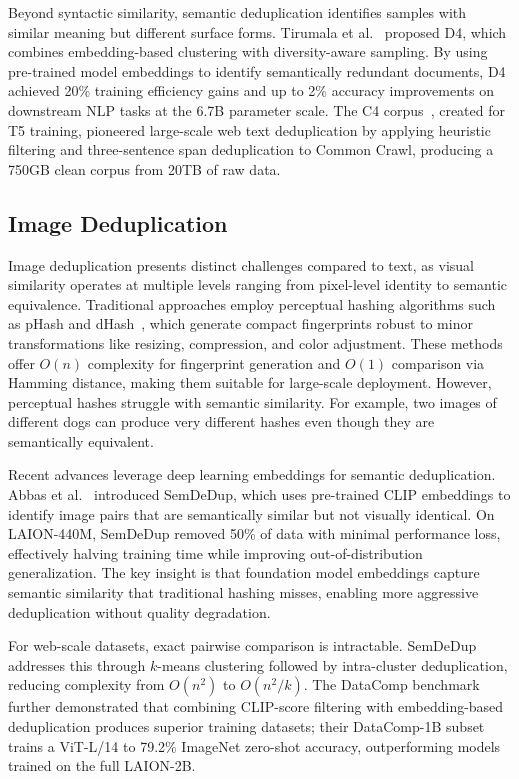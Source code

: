 \documentclass[sigconf, nonacm]{acmart}
\begin{document}
Beyond syntactic similarity, semantic deduplication identifies samples with similar meaning but different surface forms. Tirumala et al.~\cite{tirumala2023d4} proposed D4, which combines embedding-based clustering with diversity-aware sampling. By using pre-trained model embeddings to identify semantically redundant documents, D4 achieved 20\% training efficiency gains and up to 2\% accuracy improvements on downstream NLP tasks at the 6.7B parameter scale. The C4 corpus~\cite{raffel2020exploring}, created for T5 training, pioneered large-scale web text deduplication by applying heuristic filtering and three-sentence span deduplication to Common Crawl, producing a 750GB clean corpus from 20TB of raw data.



\subsection{Image Deduplication}

Image deduplication presents distinct challenges compared to text, as visual similarity operates at multiple levels ranging from pixel-level identity to semantic equivalence. Traditional approaches employ perceptual hashing algorithms such as pHash and dHash~\cite{zauner2010implementation}, which generate compact fingerprints robust to minor transformations like resizing, compression, and color adjustment. These methods offer $O(n)$ complexity for fingerprint generation and $O(1)$ comparison via Hamming distance, making them suitable for large-scale deployment. However, perceptual hashes struggle with semantic similarity. For example, two images of different dogs can produce very different hashes even though they are semantically equivalent.

Recent advances leverage deep learning embeddings for semantic deduplication. Abbas et al.~\cite{abbas2023semdedup} introduced SemDeDup, which uses pre-trained CLIP embeddings to identify image pairs that are semantically similar but not visually identical. On LAION-440M, SemDeDup removed 50\% of data with minimal performance loss, effectively halving training time while improving out-of-distribution generalization. The key insight is that foundation model embeddings capture semantic similarity that traditional hashing misses, enabling more aggressive deduplication without quality degradation.

For web-scale datasets, exact pairwise comparison is intractable. SemDeDup addresses this through $k$-means clustering followed by intra-cluster deduplication, reducing complexity from $O(n^2)$ to $O(n^2/k)$. 
The DataComp benchmark~\cite{gadre2023datacomp} further demonstrated that combining CLIP-score filtering with embedding-based deduplication produces superior training datasets; their DataComp-1B subset trains a ViT-L/14 to 79.2\% ImageNet zero-shot accuracy, outperforming models trained on the full LAION-2B.
\end{document}
